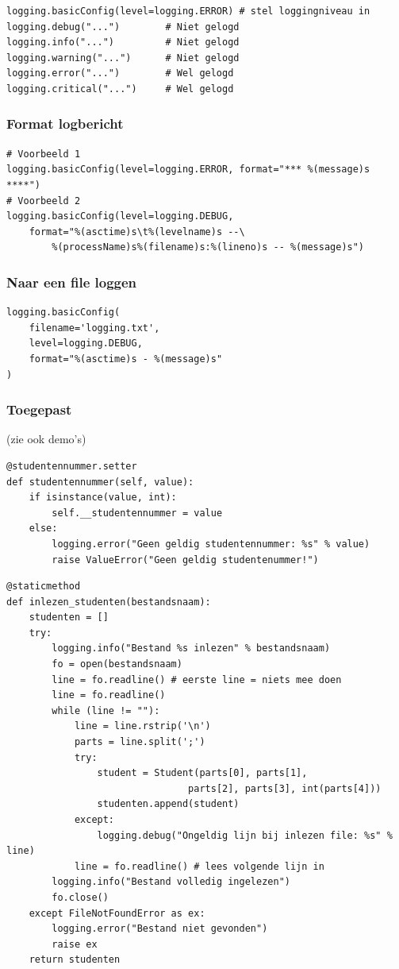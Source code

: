 \documentclass{article}
\begin{document}
\begin{verbatim}
logging.basicConfig(level=logging.ERROR) # stel loggingniveau in
logging.debug("...")        # Niet gelogd
logging.info("...")         # Niet gelogd
logging.warning("...")      # Niet gelogd
logging.error("...")        # Wel gelogd
logging.critical("...")     # Wel gelogd
\end{verbatim}

\subsubsection{Format logbericht}

\begin{verbatim}
# Voorbeeld 1
logging.basicConfig(level=logging.ERROR, format="*** %(message)s ****")
# Voorbeeld 2
logging.basicConfig(level=logging.DEBUG,
    format="%(asctime)s\t%(levelname)s --\
        %(processName)s%(filename)s:%(lineno)s -- %(message)s")
\end{verbatim}

\subsubsection{Naar een file loggen}

\begin{verbatim}
logging.basicConfig(
    filename='logging.txt',
    level=logging.DEBUG,
    format="%(asctime)s - %(message)s"
)
\end{verbatim}

\subsubsection{Toegepast}

(zie ook demo's)

\begin{verbatim}
@studentennummer.setter
def studentennummer(self, value):
    if isinstance(value, int):
        self.__studentennummer = value
    else:
        logging.error("Geen geldig studentennummer: %s" % value)
        raise ValueError("Geen geldig studentenummer!")
\end{verbatim}

\begin{verbatim}
@staticmethod
def inlezen_studenten(bestandsnaam):
    studenten = []
    try:
        logging.info("Bestand %s inlezen" % bestandsnaam)
        fo = open(bestandsnaam)
        line = fo.readline() # eerste line = niets mee doen
        line = fo.readline()
        while (line != ""):
            line = line.rstrip('\n')
            parts = line.split(';')
            try:
                student = Student(parts[0], parts[1], 
                                parts[2], parts[3], int(parts[4]))
                studenten.append(student)
            except:
                logging.debug("Ongeldig lijn bij inlezen file: %s" % line)
            line = fo.readline() # lees volgende lijn in
        logging.info("Bestand volledig ingelezen")
        fo.close()
    except FileNotFoundError as ex:
        logging.error("Bestand niet gevonden")
        raise ex
    return studenten
\end{verbatim}
\end{document}
